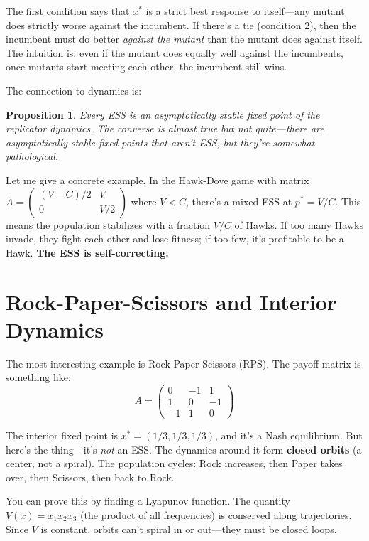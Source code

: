 \documentclass[11pt]{article}
\newtheorem{proposition}{Proposition}
\begin{document}
The first condition says that $x^*$ is a strict best response to itself---any mutant does strictly worse against the incumbent. If there's a tie (condition 2), then the incumbent must do better \textit{against the mutant} than the mutant does against itself. The intuition is: even if the mutant does equally well against the incumbents, once mutants start meeting each other, the incumbent still wins.

The connection to dynamics is:

\begin{proposition}
Every ESS is an asymptotically stable fixed point of the replicator dynamics. The converse is almost true but not quite---there are asymptotically stable fixed points that aren't ESS, but they're somewhat pathological.
\end{proposition}

Let me give a concrete example. In the Hawk-Dove game with matrix $A = \begin{pmatrix} (V-C)/2 & V \\ 0 & V/2 \end{pmatrix}$ where $V < C$, there's a mixed ESS at $p^* = V/C$. This means the population stabilizes with a fraction $V/C$ of Hawks. If too many Hawks invade, they fight each other and lose fitness; if too few, it's profitable to be a Hawk. \textbf{The ESS is self-correcting.}

\section{Rock-Paper-Scissors and Interior Dynamics}

The most interesting example is Rock-Paper-Scissors (RPS). The payoff matrix is something like:
\begin{equation}
    A = \begin{pmatrix} 0 & -1 & 1 \\ 1 & 0 & -1 \\ -1 & 1 & 0 \end{pmatrix}
\end{equation}

The interior fixed point is $x^* = (1/3, 1/3, 1/3)$, and it's a Nash equilibrium. But here's the thing---it's \textit{not} an ESS. The dynamics around it form \textbf{closed orbits} (a center, not a spiral). The population cycles: Rock increases, then Paper takes over, then Scissors, then back to Rock.

You can prove this by finding a Lyapunov function. The quantity $V(x) = x_1 x_2 x_3$ (the product of all frequencies) is conserved along trajectories. Since $V$ is constant, orbits can't spiral in or out---they must be closed loops.
\end{document}
